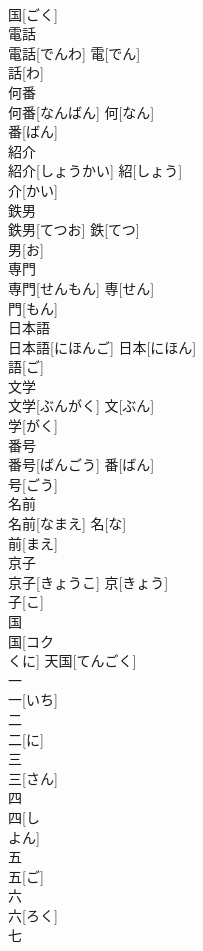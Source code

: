 \documentclass[8pt]{extreport}
\begin{document}
\begin{CJK}{UTF8}{min}
\\	国[ごく] 
\\	電話	
\\	電話[でんわ]	電[でん] 
\\	話[わ] 
\\	何番	
\\	何番[なんばん]	何[なん] 
\\	番[ばん] 
\\	紹介	
\\	紹介[しょうかい]	紹[しょう] 
\\	介[かい] 
\\	鉄男	
\\	鉄男[てつお]	鉄[てつ] 
\\	男[お] 
\\	専門	
\\	専門[せんもん]	専[せん] 
\\	門[もん] 
\\	日本語	
\\	日本語[にほんご]	日本[にほん] 
\\	語[ご] 
\\	文学	
\\	文学[ぶんがく]	文[ぶん] 
\\	学[がく] 
\\	番号	
\\	番号[ばんごう]	番[ばん] 
\\	号[ごう] 
\\	名前	
\\	名前[なまえ]	名[な] 
\\	前[まえ] 
\\	京子	
\\	京子[きょうこ]	京[きょう] 
\\	子[こ] 
\\	国	
\\	国[コク 
\\	くに]	天国[てんごく] 
\\	一	
\\	一[いち]	
\\	二	
\\	二[に]	
\\	三	
\\	三[さん]	
\\	四	
\\	四[し 
\\	よん]	
\\	五	
\\	五[ご]	
\\	六	
\\	六[ろく]	
\\	七	

\end{CJK}
\end{document}
